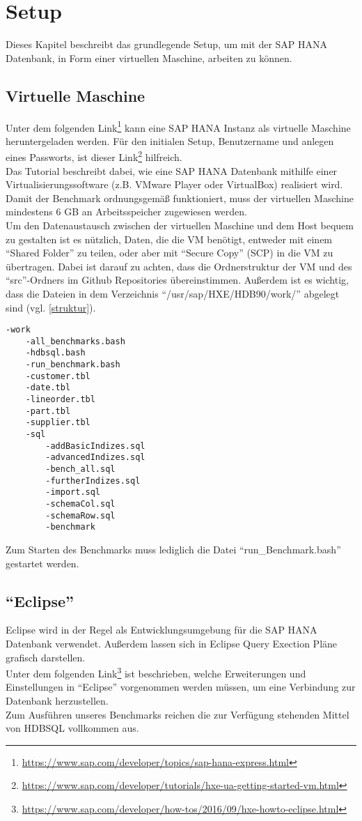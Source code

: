 \chapter{Setup}
Dieses Kapitel beschreibt das grundlegende Setup, um mit der SAP HANA Datenbank, in Form einer virtuellen Maschine, arbeiten zu können.

\section{Virtuelle Maschine}
Unter dem folgenden Link\footnote{\url{https://www.sap.com/developer/topics/sap-hana-express.html}}  kann eine SAP HANA Instanz als virtuelle Maschine heruntergeladen werden. Für den initialen Setup, Benutzername und anlegen eines Passworts, ist dieser Link\footnote{\url{https://www.sap.com/developer/tutorials/hxe-ua-getting-started-vm.html}}  hilfreich.\\
Das Tutorial beschreibt dabei, wie eine SAP HANA Datenbank mithilfe einer Virtualisierungssoftware (z.B. VMware Player oder VirtualBox) realisiert wird.\\Damit der Benchmark ordnungsgemäß funktioniert, muss der virtuellen Maschine mindestens 6 GB an Arbeitsspeicher zugewiesen werden. \\Um den Datenaustausch zwischen der virtuellen Maschine und dem Host bequem zu gestalten ist es nützlich, Daten, die die VM benötigt, entweder mit einem \enquote{Shared Folder} zu teilen, oder aber mit \enquote{Secure Copy} (SCP) in die VM zu übertragen. Dabei ist darauf zu achten, dass die Ordnerstruktur der VM und des \enquote{src}-Ordners im Github Repositories  übereinstimmen. Außerdem ist es wichtig, dass die Dateien in dem Verzeichnis \enquote{/usr/sap/HXE/HDB90/work/}  abgelegt sind (vgl. \autoref{struktur}).

\begin{lstlisting}[label=struktur, caption={Ordnerstruktur}]
-work
	-all_benchmarks.bash
	-hdbsql.bash
	-run_benchmark.bash
	-customer.tbl
	-date.tbl
	-lineorder.tbl
	-part.tbl
	-supplier.tbl
	-sql
		-addBasicIndizes.sql
		-advancedIndizes.sql
		-bench_all.sql
		-furtherIndizes.sql
		-import.sql
		-schemaCol.sql
		-schemaRow.sql
		-benchmark	
\end{lstlisting}
Zum Starten des Benchmarks muss lediglich die Datei \enquote{run\_Benchmark.bash} gestartet werden.


\section{\enquote{Eclipse}}
Eclipse wird in der Regel als Entwicklungsumgebung für die SAP HANA Datenbank verwendet. Außerdem lassen sich in Eclipse Query Exection Pläne grafisch darstellen.
\\Unter dem folgenden Link\footnote{\url{https://www.sap.com/developer/how-tos/2016/09/hxe-howto-eclipse.html}} ist beschrieben, welche Erweiterungen und Einstellungen in \enquote{Eclipse} vorgenommen werden müssen, um eine Verbindung zur Datenbank herzustellen.\\Zum Ausführen unseres Benchmarks reichen die zur Verfügung stehenden Mittel von HDBSQL vollkommen aus.

